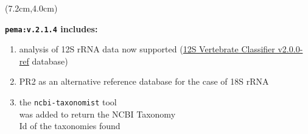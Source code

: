 \documentclass{beamer}
\begin{document}
\begin{frame}
\begin{singlespace}


         \begin{textblock*}{5cm}(7.2cm,4.0cm) %
            
            \scriptsize

            \textbf{\texttt{pema:v.2.1.4} includes:}

            \begin{enumerate}
               \item analysis of 12S rRNA data now supported
                     (\href{https://github.com/terrimporter/12SvertebrateClassifier/releases}{12S Vertebrate Classifier v2.0.0-ref} database) 
               \item PR2 as an alternative reference 
                     database for the case of 18S rRNA 
               \item the \texttt{ncbi-taxonomist} tool \\ 
                     was added to return the NCBI Taxonomy \\ 
                     Id of the taxonomies found
            \end{enumerate}
         \end{textblock*}
      \end{singlespace}


   \end{frame}
   \fi 
\end{document}
